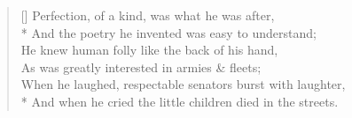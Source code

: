 \documentclass[MAIN]{subfiles}
\begin{document}
\settowidth{\versewidth}{And the poetry he invented was easy to understand;}
\begin{verse}[\versewidth]
Perfection, of a kind, was what he was after,\\*
And the poetry he invented was easy to understand;\\
He knew human folly like the back of his hand,\\
As was greatly interested in armies \& fleets;\\
When he laughed, respectable senators burst with laughter,\\*
And when he cried the little children died in the streets.
\end{verse}
\end{document}
